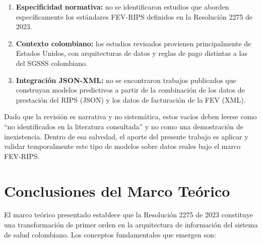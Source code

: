 \documentclass[12pt,letterpaper]{report}
\begin{document}
\begin{enumerate}
    \item \textbf{Especificidad normativa:} no se identificaron estudios que aborden específicamente los estándares FEV-RIPS definidos en la Resolución 2275 de 2023.

    \item \textbf{Contexto colombiano:} los estudios revisados provienen principalmente de Estados Unidos, con arquitecturas de datos y reglas de pago distintas a las del SGSSS colombiano.

    \item \textbf{Integración JSON-XML:} no se encontraron trabajos publicados que construyan modelos predictivos a partir de la combinación de los datos de prestación del RIPS (JSON) y los datos de facturación de la FEV (XML).
\end{enumerate}

Dado que la revisión es narrativa y no sistemática, estos vacíos deben leerse como ``no identificados en la literatura consultada'' y no como una demostración de inexistencia. Dentro de esa salvedad, el aporte del presente trabajo es aplicar y validar temporalmente este tipo de modelos sobre datos reales bajo el marco FEV-RIPS.

\section{Conclusiones del Marco Teórico}

El marco teórico presentado establece que la Resolución 2275 de 2023 constituye una transformación de primer orden en la arquitectura de información del sistema de salud colombiano. Los conceptos fundamentales que emergen son:
\end{document}
